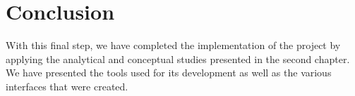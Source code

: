 


\section{Conclusion}
With this final step, we have completed the implementation of the project by applying the analytical and conceptual studies presented in the second chapter. We have presented the tools used for its development as well as the various interfaces that were created.
\pagebreak
